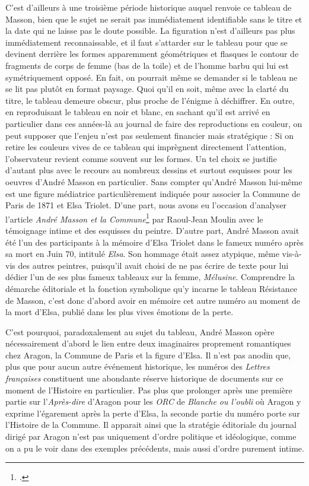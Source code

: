 C’est d’ailleurs à une troisième période historique auquel renvoie ce tableau de Masson, bien que le sujet ne serait pas immédiatement identifiable sans le titre et la date qui ne laisse pas le doute possible. La figuration n’est d’ailleurs pas plus immédiatement reconnaissable, et il faut s’attarder sur le tableau pour que se devinent derrière les formes apparemment géométriques et flasques le contour de fragments de corps de femme (bas de la toile) et de l’homme barbu qui lui est symétriquement opposé. En fait, on pourrait même se demander si le tableau ne se lit pas plutôt en format paysage. Quoi qu’il en soit, même avec la clarté du titre, le tableau demeure obscur, plus proche de l’énigme à déchiffrer. En outre, en reproduisant le tableau en noir et blanc, en sachant qu’il est arrivé en particulier dans ces années-là au journal de faire des reproductions en couleur, on peut supposer que l’enjeu n’est pas seulement financier mais stratégique : Si on retire les couleurs vives de ce tableau qui imprègnent directement l’attention, l’observateur revient comme souvent sur les formes. Un tel choix se justifie d’autant plus avec le recours au nombreux dessins et surtout esquisses pour les oeuvres d’André Masson en particulier. Sans compter qu’André Masson lui-même est une figure médiatrice particulièrement indiquée pour associer la Commune de Paris de 1871 et Elsa Triolet. D’une part, nous avons eu l’occasion d’analyser l’article \emph{André Masson et la Commune}\footcite{commune} par  Raoul-Jean Moulin avec le témoignage intime et des esquisses du peintre. D’autre part, André Masson avait été l’un des participants à la mémoire d’Elsa Triolet dans le fameux numéro après sa mort en Juin 70, intitulé \emph{Elsa}. Son hommage était assez atypique, même vis-à-vis des autres peintres, puisqu’il avait choisi de ne pas écrire de texte pour lui dédier l’un de ses plus fameux  tableaux sur la femme, \emph{Mélusine}. Comprendre la démarche éditoriale et la fonction symbolique qu’y incarne le tableau Résistance de Masson, c’est donc d’abord avoir en mémoire cet autre numéro au moment de la mort d’Elsa, publié dans les plus vives émotions de la perte.




C’est pourquoi, paradoxalement au sujet du tableau, André Masson opère nécessairement d’abord le lien entre deux imaginaires proprement romantiques chez Aragon, la Commune de Paris et la figure d’Elsa. Il n’est pas anodin que, plus que pour aucun autre événement historique, les numéros des \emph{Lettres françaises} constituent une abondante réserve historique de documents sur ce moment de l’Histoire en particulier. Pas plus que prolonger après une première partie sur l’\emph{Après-dire} d’Aragon pour les \emph{ORC} de \emph{Blanche ou l’oubli} où Aragon y exprime l’égarement après la perte d’Elsa, la seconde partie du numéro porte sur l’Histoire de la Commune. Il apparait ainsi que la stratégie éditoriale du journal dirigé par Aragon n’est pas uniquement d’ordre politique et idéologique, comme on a pu le voir dans des exemples précédents, mais aussi d’ordre purement intime. 


